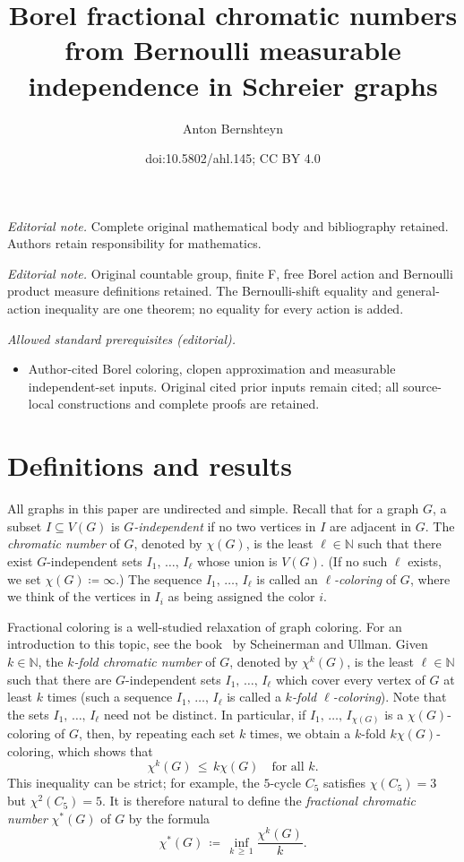 \documentclass[10pt]{amsart}
\title{Borel fractional chromatic numbers from Bernoulli measurable independence in Schreier graphs}
\author{Anton Bernshteyn}
\date{doi:10.5802/ahl.145; CC BY 4.0}
\theoremstyle{definition}
\newcommand{\0}{\varnothing}
\renewcommand{\leq}{\leqslant}
\renewcommand{\geq}{\geqslant}
\newcommand{\defeq}{\coloneqq}
\newcommand{\N}{{\mathbb{N}}}
\begin{document}
\maketitle
\noindent\textit{Editorial note.} Complete original mathematical body and bibliography retained. Authors retain responsibility for mathematics.\par\medskip
\noindent\textit{Editorial note.} Original countable group, finite F, free Borel action and Bernoulli product measure definitions retained. The Bernoulli-shift equality and general-action inequality are one theorem; no equality for every action is added.\par\medskip
\noindent\textit{Allowed standard prerequisites (editorial).}\begin{itemize}
\item Author-cited Borel coloring, clopen approximation and measurable independent-set inputs. Original cited prior inputs remain cited; all source-local constructions and complete proofs are retained.
\end{itemize}\medskip
\section{Definitions and results}

All graphs in this paper are undirected and simple. Recall that for a graph $G$, a subset $I \subseteq V(G)$ is \emph{$G$-independent} if no two vertices in $I$ are adjacent in $G$. The \emph{chromatic number} of $G$, denoted by $\chi(G)$, is the least $\ell \in \N$ such that there exist $G$-independent sets $I_1,\,\ldots,\,I_\ell$ whose union is $V(G)$. (If no such $\ell$ exists, we set $\chi(G)
\defeq \infty$.) The sequence $I_1,\,\ldots,\, I_\ell$ is called an \emph{$\ell$-coloring} of $G$, where we think of the vertices in $I_i$ as being assigned the color $i$.

Fractional coloring is a well-studied relaxation of graph coloring. For an introduction to this topic, see the book~\cite{FracBook} by Scheinerman and Ullman. Given $k \in \N$, the \emph{$k$-fold chromatic number} of $G$, denoted by $\chi^k(G)$, is the least $\ell \in \N$ such that there are $G$-independent sets $I_1,\,\ldots,\,I_\ell$ which cover every vertex of $G$ at least $k$ times (such a sequence $I_1,\, \ldots, \, I_\ell$ is called a \emph{$k$-fold $\ell$-coloring}). Note that the sets $I_1,\, \ldots,\, I_\ell$ need not be distinct. In particular, if $I_1,\, \ldots,\, I_{\chi(G)}$ is a $\chi(G)$-coloring of $G$, then, by repeating each set $k$ times, we obtain a $k$-fold $k\chi(G)$-coloring, which shows that
\[
\chi^k(G) \,\leq\, k \chi(G) \quad \text{for all } k.
\]
This inequality can be strict; for example, the $5$-cycle $C_5$ satisfies $\chi(C_5) = 3$ but $\chi^2(C_5) = 5$. It is therefore natural to define the \emph{fractional chromatic number} $\chi^\ast(G)$ of $G$ by the formula
\[
\chi^\ast(G) \,
\defeq\, \inf_{k\,\geq\,1} \frac{\chi^k(G)}{k}.
\]
\end{document}
